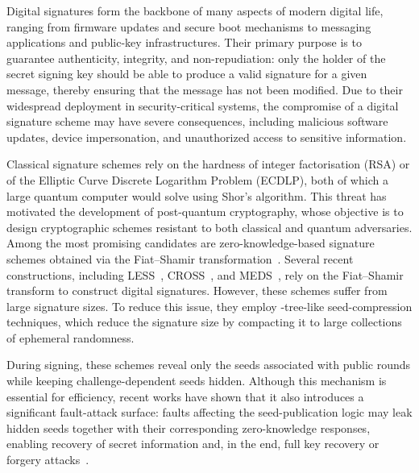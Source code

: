 Digital signatures form the backbone of many aspects of modern digital life, 
ranging from firmware updates and secure boot mechanisms to messaging applications 
and public-key infrastructures. Their primary purpose is to guarantee authenticity, 
integrity, and non-repudiation: only the holder of the secret signing 
key should be able to produce a valid signature for a given message, thereby 
ensuring that the message has not been modified. Due to their widespread 
deployment in security-critical systems, the compromise of a digital 
signature scheme may have severe consequences, including malicious 
software updates, device impersonation, and unauthorized access to 
sensitive information.

Classical signature schemes rely on the hardness of integer factorisation
(RSA) or of the Elliptic Curve Discrete Logarithm Problem (ECDLP), both of
which a large quantum computer would solve using Shor's algorithm. This threat has 
motivated the development of post-quantum cryptography, whose objective is to 
design cryptographic schemes resistant to both classical and quantum adversaries. 
Among the most promising candidates are zero-knowledge-based signature schemes 
obtained via the Fiat--Shamir transformation~\cite{DagdelenFG13,FiatS86}.
Several recent constructions, including 
LESS~\cite{LESS-spec}, CROSS~\cite{CROSSspec}, and MEDS~\cite{ChouNPRRST23,MEDS_PQC}, 
rely on the Fiat--Shamir transform to construct digital signatures. However, 
these schemes suffer from large signature sizes. To reduce this 
issue, they employ \GGM-tree-like seed-compression techniques, which reduce the 
signature size by compacting it to large collections of ephemeral randomness.

During signing, these schemes reveal only the seeds associated with public rounds 
while keeping challenge-dependent seeds hidden. Although this mechanism is essential 
for efficiency, recent works have shown that it also introduces a significant 
fault-attack surface: faults affecting the seed-publication logic may leak 
hidden seeds together with their corresponding zero-knowledge responses, 
enabling recovery of secret information and, in the end, full key recovery or 
forgery attacks~\cite{FaultToForge2025,ZKFault}.






